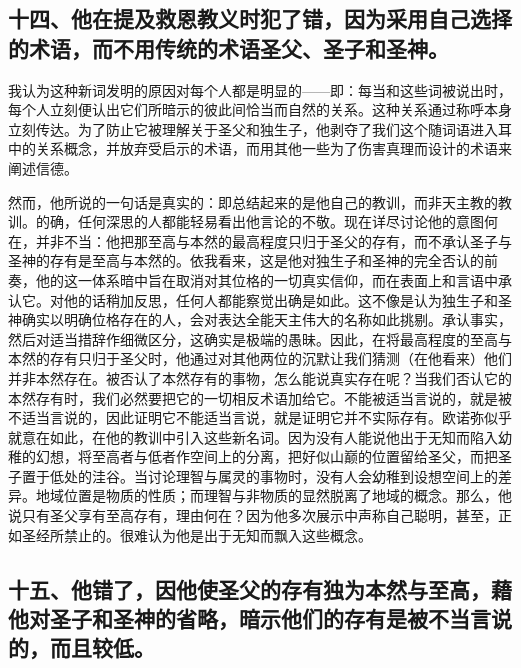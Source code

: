 
\subsection{十四、他在提及救恩教义时犯了错，因为采用自己选择的术语，而不用传统的术语圣父、圣子和圣神。}

我认为这种新词发明的原因对每个人都是明显的——即：每当和这些词被说出时，每个人立刻便认出它们所暗示的彼此间恰当而自然的关系。这种关系通过称呼本身立刻传达。为了防止它被理解关于圣父和独生子，他剥夺了我们这个随词语进入耳中的关系概念，并放弃受启示的术语，而用其他一些为了伤害真理而设计的术语来阐述信德。\par

然而，他所说的一句话是真实的：即总结起来的是他自己的教训，而非天主教的教训。的确，任何深思的人都能轻易看出他言论的不敬。现在详尽讨论他的意图何在，并非不当：他把那至高与本然的最高程度只归于圣父的存有，而不承认圣子与圣神的存有是至高与本然的。依我看来，这是他对独生子和圣神的完全否认的前奏，他的这一体系暗中旨在取消对其位格的一切真实信仰，而在表面上和言语中承认它。对他的话稍加反思，任何人都能察觉出确是如此。这不像是认为独生子和圣神确实以明确位格存在的人，会对表达全能天主伟大的名称如此挑剔。承认事实，然后对适当措辞作细微区分，这确实是极端的愚昧。因此，在将最高程度的至高与本然的存有只归于圣父时，他通过对其他两位的沉默让我们猜测（在他看来）他们并非本然存在。被否认了本然存有的事物，怎么能说真实存在呢？当我们否认它的本然存有时，我们必然要把它的一切相反术语加给它。不能被适当言说的，就是被不适当言说的，因此证明它不能适当言说，就是证明它并不实际存有。欧诺弥似乎就意在如此，在他的教训中引入这些新名词。因为没有人能说他出于无知而陷入幼稚的幻想，将至高者与低者作空间上的分离，把好似山巅的位置留给圣父，而把圣子置于低处的洼谷。当讨论理智与属灵的事物时，没有人会幼稚到设想空间上的差异。地域位置是物质的性质；而理智与非物质的显然脱离了地域的概念。那么，他说只有圣父享有至高存有，理由何在？因为他多次展示中声称自己聪明，甚至，正如圣经所禁止的。很难认为他是出于无知而飘入这些概念。\par


\subsection{十五、他错了，因他使圣父的存有独为本然与至高，藉他对圣子和圣神的省略，暗示他们的存有是被不当言说的，而且较低。}

